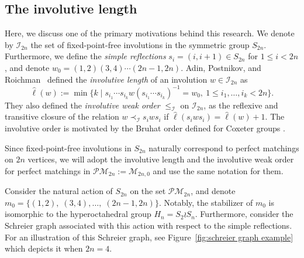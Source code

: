 \documentclass[ALCO]{cedram}
\newcommand{\M}{\mathcal{M}}
\newcommand{\I}{\mathcal{I}}
\newcommand{\PM}{\mathcal{PM}}
\begin{document}
\subsection{The involutive length}
\label{subsec:schreier graph of perfect matchings}

Here, we discuss one of the primary motivations behind this research. We denote by $\I_{2n}$ the set of fixed-point-free involutions in the symmetric group $S_{2n}$. Furthermore, we define the \emph{simple reflections} $s_i = (i,i+1) \in S_{2n}$ for $1 \le i < 2n$, and denote $w_0 = (1,2)(3,4)\cdots (2n-1,2n)$. Adin, Postnikov, and Roichman~\cite{gelfand_involutions} defined the \emph{involutive length} of an involution $w \in \I_{2n}$ as
\[
    \hat{\ell}(w) := \min\{k \mid s_{i_1}\cdots s_{i_k} w (s_{i_1}\cdots s_{i_k})^{-1} = w_0,\ 1 \le i_1,\dots,i_k <2n\}.
\]
They also defined the \emph{involutive weak order} $\le_\I$ on $\I_{2n}$, as the reflexive and transitive closure of the relation $w \prec_\I s_i w s_i$ if $\hat{\ell}(s_i w s_i) = \hat{\ell}(w) + 1$. The involutive order is motivated by the Bruhat order defined for Coxeter groups \cite[Chapter 2]{bjorner2005combinatorics}.

Since fixed-point-free involutions in $S_{2n}$ naturally correspond to perfect matchings on $2n$ vertices, we will adopt the involutive length and the involutive weak order for perfect matchings in $\PM_{2n} := \M_{2n,0}$ and use the same notation for them.

Consider the natural action of $S_{2n}$ on the set $\PM_{2n}$, and denote $m_0 = \{(1,2),\; (3,4),\dots,\;\allowbreak (2n-1,2n)\}$. Notably, the stabilizer of $m_0$ is isomorphic to the hyperoctahedral group $H_n = S_2 \wr S_n$. Furthermore, consider the Schreier graph associated with this action with respect to the simple reflections. %
For an illustration of this Schreier graph, see Figure~\ref{fig:schreier graph example} which depicts it when $2n=4$.
\end{document}
